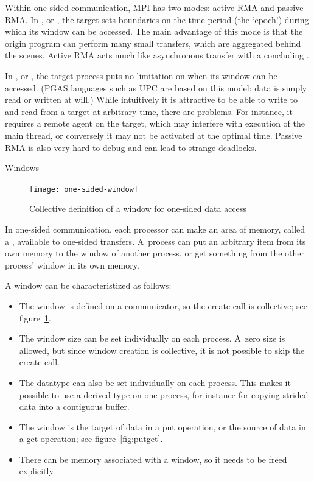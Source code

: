Within one-sided communication, MPI has two modes: active RMA and
passive RMA. In , or ,
the target sets boundaries on the time period (the `epoch')
during which its window can be accessed.
The main advantage
of this mode is that the origin program can perform many small transfers, which are
aggregated behind the scenes. Active RMA acts much like asynchronous transfer with a
concluding .

In , or ,
the target process puts no limitation on when its window can be accessed.
(\ac{PGAS} languages such as \ac{UPC} are based on this model: data is 
simply read or written at will.)
While 
intuitively it is attractive to be able to write to and read from a target at
arbitrary time,
there are problems. For instance, it requires a remote agent on the target,
which may interfere with execution of the main thread, or conversely it may not be
activated at the optimal time. Passive RMA is also very hard to debug and can lead
to strange deadlocks.


 {Windows}
\label{sec:windows}

\begin{figure}[ht]
  \texttt{[image: one-sided-window]}
  \caption{Collective definition of a window for one-sided data access}
  \label{fig:window}
\end{figure}

In one-sided communication, each processor can make an area of memory,
called a , available to one-sided transfers.
A~process can put an arbitrary item from its own memory to the
window of another process, or get something from the other process'
window in its own memory.

A window can be characteristized as follows:
\begin{itemize}
\item The window is defined on a communicator, so the create call
  is collective; see figure~\ref{fig:window}. 
\item The window size can be set individually on each process.
  A~zero size is allowed, but since window creation is collective,
  it is not possible to skip the create call.
\item The datatype can also be set individually on each process. This
  makes it possible to use a derived type on one process, for instance
  for copying strided data into a contiguous buffer.
\item The window is the target of data in a put operation, or the
  source of data in a get operation; see figure~\ref{fig:putget}.
\item There can be memory associated with a window, so it needs to be
  freed explicitly.
\end{itemize}

